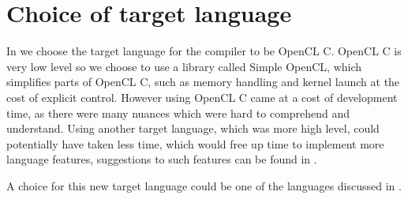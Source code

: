 \section{Choice of target language}
In  we choose the target language for the compiler to be OpenCL C.
OpenCL C is very low level so we choose to use a library called Simple OpenCL, which simplifies parts of OpenCL C, such as memory handling and kernel launch at the cost of explicit control. 
However using OpenCL C came at a cost of development time, as there were many nuances which were hard to comprehend and understand. 
Using another target language, which was more high level, could potentially have taken less time, which would free up time to implement more language features, suggestions to such features can be found in . 

A choice for this new target language could be one of the languages discussed in .
